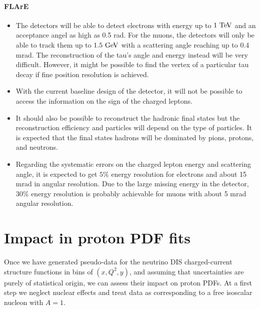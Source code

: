 \documentclass[11pt,a4paper]{article}
\numberwithin{equation}{section}
\numberwithin{figure}{section}
\numberwithin{table}{section}
\begin{document}
\paragraph{FLArE}
\begin{itemize}
    \item The detectors will be able to detect electrons with energy up to
    $1~\rm{TeV}$ and an acceptance angel as high as 0.5 rad. For the muons,
    the detectors will only be able to track them up to $1.5~\rm{GeV}$ with
    a scattering angle reaching up to 0.4 mrad. The reconstruction of the
    tau's angle and energy instead will be very difficult. However, it might
    be possible to find the vertex of a particular tau decay if fine position
    resolution is achieved.
    \item With the current baseline design of the detector, it will not be
    possible to access the information on the sign of the charged leptons.
    \item It should also be possible to reconstruct the hadronic final
    states but the reconstruction efficiency and particles will depend on
    the type of particles. It is expected that the final states hadrons will
    be dominated by pions, protons, and neutrons.
    \item Regarding the systematic errors on the charged lepton energy and
    scattering angle, it is expected to get $5\%$ energy resolution for
    electrons and about 15 mrad in angular resolution. Due to the large
    missing energy in the detector, $30\%$ energy resolution is probably
    achievable for muons with about 5 mrad angular resolution.
\end{itemize}

\section{Impact in proton PDF fits}

Once we have generated pseudo-data for the 
neutrino DIS charged-current structure functions
in bins of $(x,Q^2,y)$, and assuming that uncertainties
are purely of statistical origin, we can assess their
impact on proton PDFs.
%
At a first step we neglect nuclear effects
and treat data as corresponding to a free isoscalar
nucleon with $A=1$.
\end{document}

